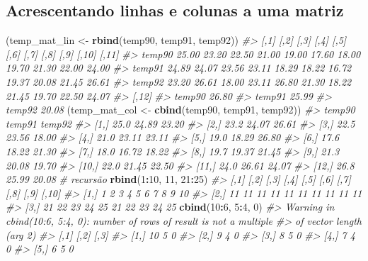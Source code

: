 \documentclass[]{book}
\newenvironment{Shaded}{\begin{snugshade}}{\end{snugshade}}
\newcommand{\KeywordTok}[1]{\textcolor[rgb]{0.13,0.29,0.53}{\textbf{#1}}}
\newcommand{\DecValTok}[1]{\textcolor[rgb]{0.00,0.00,0.81}{#1}}
\newcommand{\StringTok}[1]{\textcolor[rgb]{0.31,0.60,0.02}{#1}}
\newcommand{\CommentTok}[1]{\textcolor[rgb]{0.56,0.35,0.01}{\textit{#1}}}
\newcommand{\OperatorTok}[1]{\textcolor[rgb]{0.81,0.36,0.00}{\textbf{#1}}}
\newcommand{\NormalTok}[1]{#1}
\begin{document}
\subsection{Acrescentando linhas e colunas a uma
matriz}\label{acrescentando-linhas-e-colunas-a-uma-matriz}

\begin{Shaded}
\begin{Highlighting}[]
\NormalTok{(temp_mat_lin <-}\StringTok{ }\KeywordTok{rbind}\NormalTok{(temp90, temp91, temp92))}
\CommentTok{#>         [,1]  [,2]  [,3]  [,4]  [,5]  [,6]  [,7]  [,8]  [,9] [,10] [,11]}
\CommentTok{#> temp90 25.00 23.20 22.50 21.00 19.00 17.60 18.00 19.70 21.30 22.00 24.00}
\CommentTok{#> temp91 24.89 24.07 23.56 23.11 18.29 18.22 16.72 19.37 20.08 21.45 26.61}
\CommentTok{#> temp92 23.20 26.61 18.00 23.11 26.80 21.30 18.22 21.45 19.70 22.50 24.07}
\CommentTok{#>        [,12]}
\CommentTok{#> temp90 26.80}
\CommentTok{#> temp91 25.99}
\CommentTok{#> temp92 20.08}
\NormalTok{(temp_mat_col <-}\StringTok{ }\KeywordTok{cbind}\NormalTok{(temp90, temp91, temp92))}
\CommentTok{#>       temp90 temp91 temp92}
\CommentTok{#>  [1,]   25.0  24.89  23.20}
\CommentTok{#>  [2,]   23.2  24.07  26.61}
\CommentTok{#>  [3,]   22.5  23.56  18.00}
\CommentTok{#>  [4,]   21.0  23.11  23.11}
\CommentTok{#>  [5,]   19.0  18.29  26.80}
\CommentTok{#>  [6,]   17.6  18.22  21.30}
\CommentTok{#>  [7,]   18.0  16.72  18.22}
\CommentTok{#>  [8,]   19.7  19.37  21.45}
\CommentTok{#>  [9,]   21.3  20.08  19.70}
\CommentTok{#> [10,]   22.0  21.45  22.50}
\CommentTok{#> [11,]   24.0  26.61  24.07}
\CommentTok{#> [12,]   26.8  25.99  20.08}
\CommentTok{# recursão}
\KeywordTok{rbind}\NormalTok{(}\DecValTok{1}\OperatorTok{:}\DecValTok{10}\NormalTok{, }\DecValTok{11}\NormalTok{, }\DecValTok{21}\OperatorTok{:}\DecValTok{25}\NormalTok{)}
\CommentTok{#>      [,1] [,2] [,3] [,4] [,5] [,6] [,7] [,8] [,9] [,10]}
\CommentTok{#> [1,]    1    2    3    4    5    6    7    8    9    10}
\CommentTok{#> [2,]   11   11   11   11   11   11   11   11   11    11}
\CommentTok{#> [3,]   21   22   23   24   25   21   22   23   24    25}
\KeywordTok{cbind}\NormalTok{(}\DecValTok{10}\OperatorTok{:}\DecValTok{6}\NormalTok{, }\DecValTok{5}\OperatorTok{:}\DecValTok{4}\NormalTok{, }\DecValTok{0}\NormalTok{)}
\CommentTok{#> Warning in cbind(10:6, 5:4, 0): number of rows of result is not a multiple}
\CommentTok{#> of vector length (arg 2)}
\CommentTok{#>      [,1] [,2] [,3]}
\CommentTok{#> [1,]   10    5    0}
\CommentTok{#> [2,]    9    4    0}
\CommentTok{#> [3,]    8    5    0}
\CommentTok{#> [4,]    7    4    0}
\CommentTok{#> [5,]    6    5    0}
\end{Highlighting}
\end{Shaded}
\end{document}
